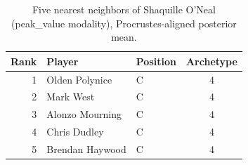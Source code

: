 \begin{table}[htbp]
  \centering\small
  \begin{tabular}{rllc}
    \toprule
    Rank & Player & Position & Archetype \\
    \midrule
    1 & Olden Polynice & C & 4 \\
    2 & Mark West & C & 4 \\
    3 & Alonzo Mourning & C & 4 \\
    4 & Chris Dudley & C & 4 \\
    5 & Brendan Haywood & C & 4 \\
    \bottomrule
  \end{tabular}
  \caption{Five nearest neighbors of Shaquille O'Neal (peak_value modality), Procrustes-aligned posterior mean.}
  \label{tab:Shaquille_O_Neal_neighbors_peak_value}
\end{table}

